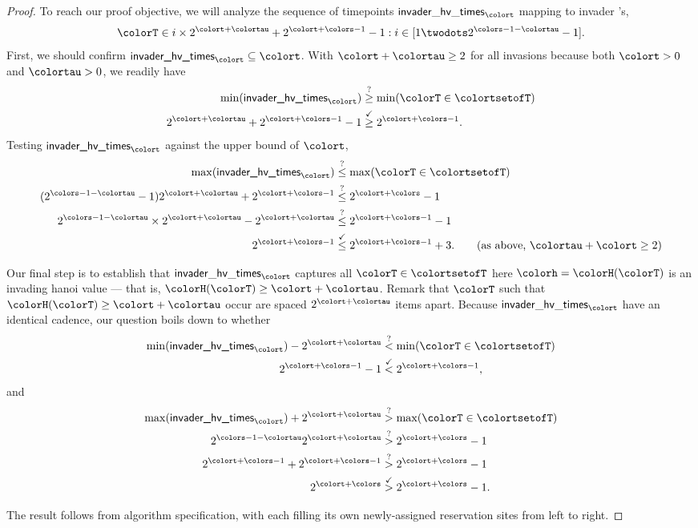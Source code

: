 \begin{proof}
To reach our proof objective, we will analyze the sequence of timepoints $\mathsf{invader\_hv\_times}_{\colort}$ mapping to invader \hv{}'s,
\begin{align*}
\colorT \in i \times 2^{\colort + \colortau} +
2^{\colort + \colors - 1} - 1
:
i \in [1 \twodots 2^{\colors - 1 - \colortau} - 1].
\end{align*}
First, we should confirm $\textsf{invader\_hv\_times}_{\colort} \subseteq \colort$.
With $\colort + \colortau \geq 2$ for all invasions because both $\colort > 0$ and $\colortau > 0$, we readily have
\begin{align*}
\min(\textsf{invader\_hv\_times}_{\colort})
&\stackrel{?}{\geq}
\min(\colorT \in \colortsetofT)\\
2^{\colort + \colortau} + 2^{\colort + \colors - 1} - 1
&\stackrel{\checkmark}{\geq}
2^{\colort + \colors - 1}.
\end{align*}
Testing $\textsf{invader\_hv\_times}_{\colort}$ against the upper bound of $\colort$,
\begin{align*}
\max(\textsf{invader\_hv\_times}_{\colort})
&\stackrel{?}{\leq}
\max(\colorT \in \colortsetofT)
\\
(2^{\colors - 1 - \colortau}  - 1)
2^{\colort + \colortau} + 2^{\colort + \colors - 1}
&\stackrel{?}{\leq}
2^{\colort + \colors} - 1
\\
2^{\colors - 1 - \colortau} \times 2^{\colort + \colortau} - 2^{\colort + \colortau}
&\stackrel{?}{\leq}
2^{\colort + \colors - 1} - 1
\\
2^{\colort + \colors - 1}
&\stackrel{\checkmark}{\leq}
2^{\colort + \colors - 1} + 3.
\tag{as above, $\colortau + \colort \geq 2$}
\end{align*}

Our final step is to establish that $\mathsf{invader\_hv\_times}_{\colort}$ captures all $\colorT \in \colortsetofT$ here $\colorh = \colorH(\colorT)$ is an invading hanoi value --- that is, $\colorH(\colorT) \geq \colort + \colortau$.
Remark that $\colorT$ such that $\colorH(\colorT) \geq \colort + \colortau$ occur are spaced $2^{\colort + \colortau}$ items apart.
Because $\mathsf{invader\_hv\_times}_{\colort}$ have an identical cadence, our question boils down to whether
\begin{align*}
\min(\textsf{invader\_hv\_times}_{\colort})
- 2^{\colort + \colortau}
&\stackrel{?}{<}
\min(\colorT \in \colortsetofT)\\
2^{\colort + \colors - 1} - 1
&\stackrel{\checkmark}{<}
2^{\colort + \colors - 1},
\end{align*}
and
\begin{align*}
\max(\textsf{invader\_hv\_times}_{\colort})
+ 2^{\colort + \colortau}
&\stackrel{?}{>}
\max(\colorT \in \colortsetofT)\\
2^{\colors - 1 - \colortau} 2^{\colort + \colortau}
&\stackrel{?}{>}
2^{\colort + \colors} - 1\\
2^{\colort + \colors - 1}
+ 2^{\colort + \colors - 1}
&\stackrel{?}{>}
2^{\colort + \colors} - 1\\
2^{\colort + \colors}
&\stackrel{\checkmark}{>}
2^{\colort + \colors} - 1.
\end{align*}

The result follows from algorithm specification, with each \hv{} filling its own newly-assigned reservation sites from left to right.
\end{proof}
